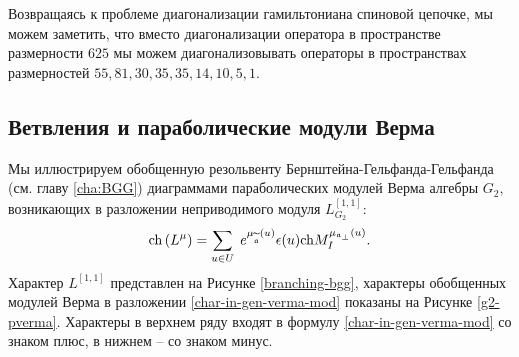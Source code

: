 Возвращаясь к проблеме диагонализации гамильтониана спиновой цепочке, мы можем заметить, что вместо диагонализации оператора в пространстве размерности  $625$ мы можем диагонализовывать операторы в пространствах размерностей $55, 81, 30, 35, 35, 14, 10, 5, 1$.

\subsection{Ветвления и параболические модули Верма}
\label{sec:branch-parab-verma}

Мы иллюстрируем обобщенную резольвенту Бернштейна-Гельфанда-Гельфанда (см. главу \ref{cha:BGG}) диаграммами параболических модулей Верма алгебры $G_{2}$, возникающих в разложении неприводимого модуля $L^{[1,1]}_{G_{2}}$:
\begin{equation}
\mathrm{ch}\left( L^{\mu }\right) =\sum_{u\in U}\;e^{\mu _{\widetilde{\mathfrak{a}}}\left(
u\right) }\epsilon (u)\mathrm{ch}M_{I}^{\mu _{\frak{a}_{\perp }}\left(
u\right) }.  \label{char-in-gen-verma-mod}
\end{equation}
Характер  $L^{[1,1]}$ представлен на Рисунке \ref{branching-bgg}, характеры обобщенных модулей Верма в разложении  \eqref{char-in-gen-verma-mod} показаны на Рисунке  \ref{g2-pverma}. Характеры в верхнем ряду входят в формулу \eqref{char-in-gen-verma-mod} со знаком плюс, в нижнем -- со знаком минус. 


